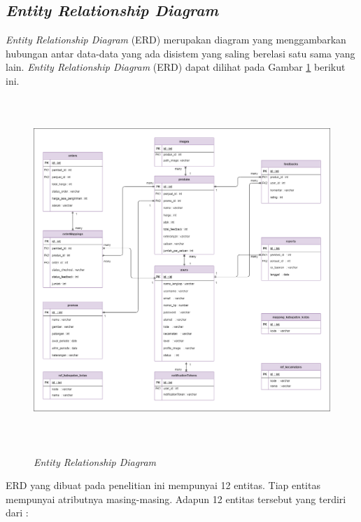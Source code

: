 \subsection{\textit{Entity Relationship Diagram}}
\textit{Entity Relationship Diagram} (ERD) merupakan diagram yang menggambarkan hubungan antar data-data yang ada disistem yang saling berelasi satu sama yang lain. \textit{Entity Relationship Diagram} (ERD) dapat dilihat pada Gambar \ref{erd} berikut ini.
\begin{landscape}
	\begin{figure}[H]
		\centering
		{\includegraphics [width = 18.5cm, height= 13cm]{gambar/erd}}
		\caption{\textit{Entity Relationship Diagram}}
		\label{erd}
	\end{figure}
\end{landscape}

ERD yang dibuat pada penelitian ini mempunyai 12 entitas. Tiap entitas mempunyai atributnya masing-masing.  Adapun 12 entitas tersebut yang terdiri dari :

